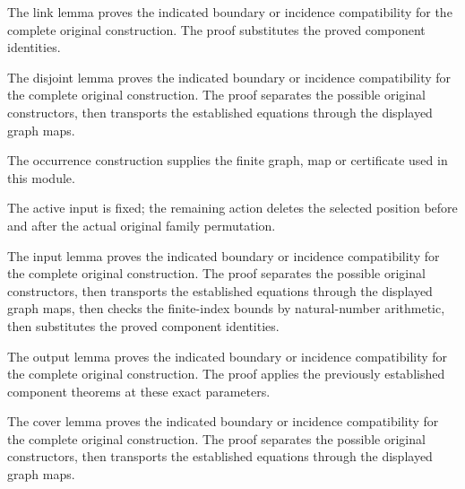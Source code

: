 The link lemma proves the indicated boundary or incidence compatibility for the complete original construction.
The proof substitutes the proved component identities.
\par{}

The disjoint lemma proves the indicated boundary or incidence compatibility for the complete original construction.
The proof separates the possible original constructors, then transports the established equations through the displayed graph maps.
\par{}

The occurrence construction supplies the finite graph, map or certificate used in this module.
\par{}

The active input is fixed; the remaining action deletes the selected
position before and after the actual original family permutation.
\par{}

The input lemma proves the indicated boundary or incidence compatibility for the complete original construction.
The proof separates the possible original constructors, then transports the established equations through the displayed graph maps, then checks the finite-index bounds by natural-number arithmetic, then substitutes the proved component identities.
\par{}

The output lemma proves the indicated boundary or incidence compatibility for the complete original construction.
The proof applies the previously established component theorems at these exact parameters.
\par{}

The cover lemma proves the indicated boundary or incidence compatibility for the complete original construction.
The proof separates the possible original constructors, then transports the established equations through the displayed graph maps.
\par{}

